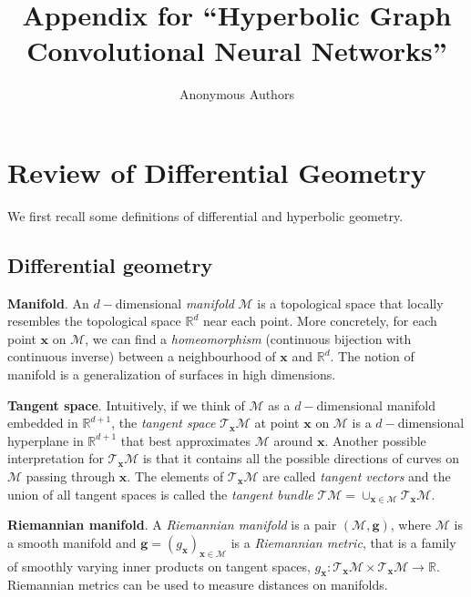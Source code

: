 \documentclass{article}
\title{Appendix for ``Hyperbolic Graph Convolutional Neural Networks''}
\author{Anonymous Authors
}
\newcommand{\xhdr}[1]{{\noindent\bfseries #1}.}
\begin{document}
\maketitle

\appendix
\section{Review of Differential Geometry}\label{appendix:diff_geom}
We first recall some definitions of differential and hyperbolic geometry.

\subsection{Differential geometry}
\xhdr{Manifold} An $d-$dimensional \textit{manifold} $\mathcal{M}$ is a topological space that locally resembles the topological space $\mathbb{R}^d$ near each point. 
More concretely, for each point $\mathbf{x}$ on $\mathcal{M}$, we can find a \textit{homeomorphism} (continuous bijection with continuous inverse) between a neighbourhood of $\mathbf{x}$ and $\mathbb{R}^d$.
The notion of manifold is a generalization of surfaces in high dimensions.

\xhdr{Tangent space}
Intuitively, if we think of $\mathcal{M}$ as a $d-$dimensional manifold embedded in $\mathbb{R}^{d+1}$, the \textit{tangent space} $\mathcal{T}_\mathbf{x}\mathcal{M}$ at point $\mathbf{x}$ on $\mathcal{M}$ is a $d-$dimensional hyperplane in $\mathbb{R}^{d+1}$ that best approximates $\mathcal{M}$ around $\mathbf{x}$. Another possible interpretation for $\mathcal{T}_\mathbf{x}\mathcal{M}$ is that it contains all the possible directions of curves on $\mathcal{M}$ passing through $\mathbf{x}$.
The elements of $\mathcal{T}_\mathbf{x}\mathcal{M}$ are called \textit{tangent vectors} and the union of all tangent spaces is called the \textit{tangent bundle} $\mathcal{T}\mathcal{M}=\cup_ {\mathbf{x}\in\mathcal{M}}\mathcal{T}_\mathbf{x}\mathcal{M}$. 

\xhdr{Riemannian manifold} A \textit{Riemannian manifold} is a pair $(\mathcal{M}, \mathbf{g})$, where $\mathcal{M}$ is a smooth manifold and $\mathbf{g}=(g_\mathbf{x})_{\mathbf{x}\in\mathcal{M}}$ is a \textit{Riemannian metric}, that is a family of smoothly varying inner products on tangent spaces, $g_\mathbf{x}:\mathcal{T}_\mathbf{x}\mathcal{M}\times\mathcal{T}_\mathbf{x}\mathcal{M}\rightarrow\mathbb{R}$.
Riemannian metrics can be used to measure distances on manifolds. 
\end{document}
